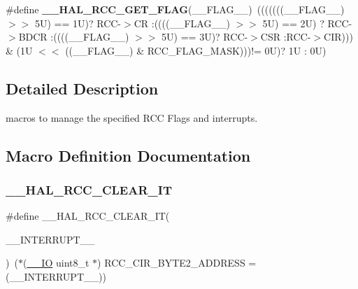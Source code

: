 \begin{DoxyCompactItemize}
\#define {\bfseries \+\_\+\+\_\+\+H\+A\+L\+\_\+\+R\+C\+C\+\_\+\+G\+E\+T\+\_\+\+F\+L\+AG}(\+\_\+\+\_\+\+F\+L\+A\+G\+\_\+\+\_\+)~(((((((\+\_\+\+\_\+\+F\+L\+A\+G\+\_\+\+\_\+) $>$$>$ 5\+U) == 1\+U)? R\+C\+C-\/$>$\+C\+R \+:((((\+\_\+\+\_\+\+F\+L\+A\+G\+\_\+\+\_\+) $>$$>$ 5\+U) == 2\+U) ? R\+C\+C-\/$>$\+B\+D\+C\+R \+:((((\+\_\+\+\_\+\+F\+L\+A\+G\+\_\+\+\_\+) $>$$>$ 5\+U) == 3\+U)? R\+C\+C-\/$>$\+C\+S\+R \+:\+R\+C\+C-\/$>$\+C\+I\+R))) \& (1\+U $<$$<$ ((\+\_\+\+\_\+\+F\+L\+A\+G\+\_\+\+\_\+) \& R\+C\+C\+\_\+\+F\+L\+A\+G\+\_\+\+M\+A\+S\+K)))!= 0\+U)? 1\+U \+: 0\+U)
\end{DoxyCompactItemize}


\subsection{Detailed Description}
macros to manage the specified R\+CC Flags and interrupts. 



\subsection{Macro Definition Documentation}
\mbox{\label{group___r_c_c___flags___interrupts___management_ga9d8ab157f58045b8daf8136bee54f139}} 
\subsubsection{\texorpdfstring{\+\_\+\+\_\+\+H\+A\+L\+\_\+\+R\+C\+C\+\_\+\+C\+L\+E\+A\+R\+\_\+\+IT}{\_\_HAL\_RCC\_CLEAR\_IT}}
{\footnotesize\ttfamily \#define \+\_\+\+\_\+\+H\+A\+L\+\_\+\+R\+C\+C\+\_\+\+C\+L\+E\+A\+R\+\_\+\+IT(\begin{DoxyParamCaption}\item[{}]{\+\_\+\+\_\+\+I\+N\+T\+E\+R\+R\+U\+P\+T\+\_\+\+\_\+ }\end{DoxyParamCaption})~($\ast$(\mbox{\hyperlink{core__sc300_8h_aec43007d9998a0a0e01faede4133d6be}{\+\_\+\+\_\+\+IO}} uint8\+\_\+t $\ast$) R\+C\+C\+\_\+\+C\+I\+R\+\_\+\+B\+Y\+T\+E2\+\_\+\+A\+D\+D\+R\+E\+SS = (\+\_\+\+\_\+\+I\+N\+T\+E\+R\+R\+U\+P\+T\+\_\+\+\_\+))}



